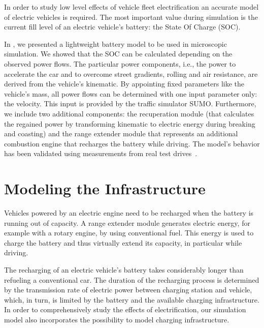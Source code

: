 \documentclass[conference]{IEEEtran}
\begin{document}
In order to study low level effects of vehicle fleet electrification an accurate model of electric vehicles is required.
The most important value during simulation is the current fill level of an electric vehicle's battery: the State Of Charge (SOC).

In \cite{batteryvtc2014fall}, we presented a lightweight battery model to be used in microscopic simulation.
We showed that the SOC can be calculated depending on the observed power flows.
The particular power components, i.e., the power to accelerate the car and to overcome street gradients, rolling and air resistance, are derived from the vehicle's kinematic.
By appointing fixed parameters like the vehicle's mass, all power flows can be determined with one input parameter only: the velocity.
This input is provided by the traffic simulator SUMO.
Furthermore, we include two additional components: the recuperation module (that calculates the regained power by transforming kinematic to electric energy during breaking and coasting) and 
the range extender module that represents an additional combustion engine that recharges the battery while driving.
The model's behavior has been validated using measurements from real test drives~\cite{batteryvtc2014fall}.



\section{Modeling the Infrastructure}

Vehicles powered by an electric engine need to be recharged when the battery is running out of capacity.
A range extender module generates electric energy, for example with a rotary engine, by using conventional fuel.
This energy is used to charge the battery and thus virtually extend its capacity, in particular while driving.

The recharging of an electric vehicle's battery takes considerably longer than refueling a conventional car.
The duration of the recharging process is determined by the transmission rate of electric power between charging station and vehicle, which,
in turn, is limited by the battery and the available charging infrastructure.
In order to comprehensively study the effects of electrification, our simulation model also incorporates the possibility to model charging infrastructure.
\end{document}
